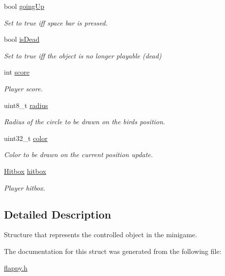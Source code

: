\begin{DoxyCompactItemize}
bool \mbox{\hyperlink{group__flappy_ga4bdcadd04d95df1a76b650b03e103522}{going\+Up}}
\begin{DoxyCompactList}\small\item\em Set to true iff space bar is pressed. \end{DoxyCompactList}\item 
bool \mbox{\hyperlink{group__flappy_gaf4f24b08e29e948d98b6014bb745c395}{is\+Dead}}
\begin{DoxyCompactList}\small\item\em Set to true iff the object is no longer playable (dead) \end{DoxyCompactList}\item 
int \mbox{\hyperlink{group__flappy_ga09a00f6fd91f17cf0d2b1b301c6a9da7}{score}}
\begin{DoxyCompactList}\small\item\em Player score. \end{DoxyCompactList}\item 
uint8\+\_\+t \mbox{\hyperlink{group__flappy_ga01e57038bda03482df87afc78bc2e0e1}{radius}}
\begin{DoxyCompactList}\small\item\em Radius of the circle to be drawn on the bird\textquotesingle{}s position. \end{DoxyCompactList}\item 
uint32\+\_\+t \mbox{\hyperlink{group__flappy_ga99a3ab5ac95874c8563f8c24aa79ae54}{color}}
\begin{DoxyCompactList}\small\item\em Color to be drawn on the current position update. \end{DoxyCompactList}\item 
\mbox{\hyperlink{struct_hitbox}{Hitbox}} \mbox{\hyperlink{group__flappy_ga22c913a0e2c2eb7faceaf256ffc2a21f}{hitbox}}
\begin{DoxyCompactList}\small\item\em Player hitbox. \end{DoxyCompactList}\end{DoxyCompactItemize}


\subsection{Detailed Description}
Structure that represents the controlled object in the minigame. 

The documentation for this struct was generated from the following file\+:\begin{DoxyCompactItemize}
\item 
\mbox{\hyperlink{flappy_8h}{flappy.\+h}}\end{DoxyCompactItemize}
